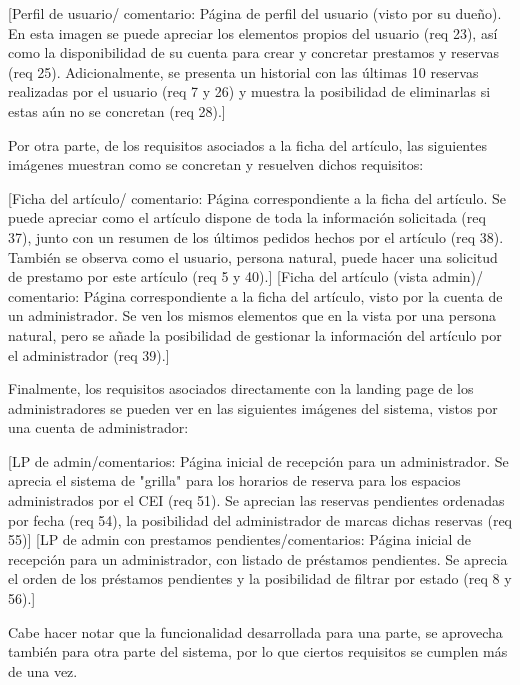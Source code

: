 [Perfil de usuario/ comentario: Página de perfil del usuario (visto por su dueño). En esta imagen se puede apreciar los elementos propios del usuario (req 23), así como la disponibilidad de su cuenta para crear y concretar prestamos y reservas (req 25). Adicionalmente, se presenta un historial con las últimas 10 reservas realizadas por el usuario (req 7 y 26) y muestra la posibilidad de eliminarlas si estas aún no se concretan (req 28).]

Por otra parte, de los requisitos asociados a la ficha del artículo, las siguientes imágenes muestran como se concretan y resuelven dichos requisitos:

[Ficha del artículo/ comentario: Página correspondiente a la ficha del artículo. Se puede apreciar como el artículo dispone de toda la información solicitada (req 37), junto con un resumen de los últimos pedidos hechos por el artículo (req 38). También se observa como el usuario, persona natural, puede hacer una solicitud de prestamo por este artículo (req 5 y 40).]
[Ficha del artículo (vista admin)/ comentario: Página correspondiente a la ficha del artículo, visto por la cuenta de un administrador. Se ven los mismos elementos que en la vista por una persona natural, pero se añade la posibilidad de gestionar la información del artículo por el administrador (req 39).]

Finalmente, los requisitos asociados directamente con la landing page de los administradores se pueden ver en las siguientes imágenes del sistema, vistos por una cuenta de administrador:

[LP de admin/comentarios: Página inicial de recepción para un administrador. Se aprecia el sistema de "grilla" para los horarios de reserva para los espacios administrados por el CEI (req 51). Se aprecian las reservas pendientes ordenadas por fecha (req 54), la posibilidad del administrador de marcas dichas reservas (req 55)]
[LP de admin con prestamos pendientes/comentarios: Página inicial de recepción para un administrador, con listado de préstamos pendientes. Se aprecia el orden de los préstamos pendientes y la posibilidad de filtrar por estado (req 8 y 56).]

Cabe hacer notar que la funcionalidad desarrollada para una parte, se aprovecha también para otra parte del sistema, por lo que ciertos requisitos se cumplen más de una vez.